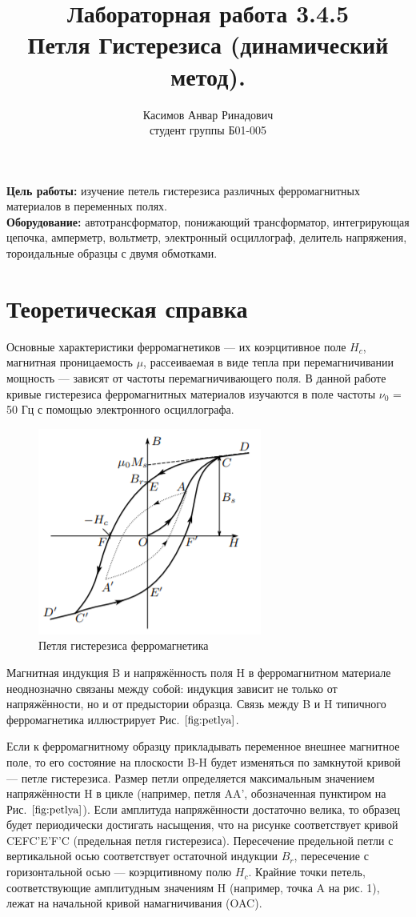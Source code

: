 \documentclass[a4paper, 12pt]{article}
\author{Касимов Анвар Ринадович\\
студент группы Б01-005}
\title{\textbf{Лабораторная работа 3.4.5 \\ 
Петля Гистерезиса (динамический метод).}}
\begin{document}
\maketitle
\thispagestyle{empty}


\textbf{Цель работы:} изучение петель гистерезиса различных ферромагнитных
материалов в переменных полях.
\\

\textbf{Оборудование:} автотрансформатор, понижающий трансформатор, интегрирующая цепочка, амперметр, вольтметр, электронный
осциллограф, делитель напряжения, тороидальные образцы с двумя обмотками.

\section{Теоретическая справка}
Основные характеристики
ферромагнетиков — их коэрцитивное поле $H_c$, магнитная проницаемость
$\mu$, рассеиваемая в виде тепла при перемагничивании мощность — зависят
от частоты перемагничивающего поля. В данной работе кривые гистерезиса ферромагнитных материалов изучаются в поле частоты $\nu_0$ = 50 Гц
с помощью электронного осциллографа.
\begin{figure}[h!]
    \centering
    \includegraphics{petlya.png}
    \caption{Петля гистерезиса ферромагнетика}
    \label{fig:petlya}
\end{figure}

Магнитная индукция B и напряжённость поля H в ферромагнитном материале неоднозначно связаны между собой: индукция зависит
не только от напряжённости, но и от предыстории образца. Связь между B и H типичного ферромагнетика иллюстрирует Рис. $\ref{fig:petlya}$.

Если к ферромагнитному образцу прикладывать переменное внешнее
магнитное поле, то его состояние на плоскости B-H будет изменяться
по замкнутой кривой — петле гистерезиса. Размер петли определяется
максимальным значением напряжённости H в цикле (например, петля AA',
обозначенная пунктиром на Рис. $\ref{fig:petlya}$). Если амплитуда напряжённости достаточно велика, то образец будет периодически достигать насыщения,
что на рисунке соответствует кривой CEFC'E'F'C (предельная петля
гистерезиса). Пересечение предельной петли с вертикальной осью соответствует остаточной индукции $B_r$, пересечение с горизонтальной осью
— коэрцитивному полю $H_c$. Крайние точки петель, соответствующие амплитудным значениям H (например, точка A на рис. 1), лежат на начальной кривой намагничивания (OAC).
\end{document}
